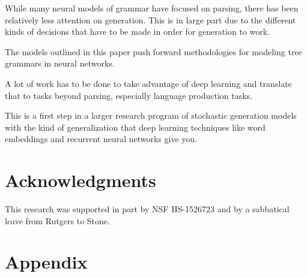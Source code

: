 \documentclass[11pt]{article}
\begin{document}
While many neural models of grammar have focused on parsing, there has been relatively less attention on generation.
%
This is in large part due to the different kinds of decisions that have to be made in order for generation to work. 


The models outlined in this paper push forward methodologies for modeling tree grammars in neural networks. 

A lot of work has to be done to take advantage of deep learning and translate that to tasks beyond parsing, especially language production tasks.

This is a first step in a larger research program of stochastic generation models with the kind of generalization that deep learning techniques like word embeddings and recurrent neural networks give you. 

\section*{Acknowledgments}

This research was supported in part by NSF IIS-1526723 and by a
sabbatical leave from Rutgers to Stone.





\newpage
\appendix

\section{Appendix}
\label{sec:appendix}
\end{document}
